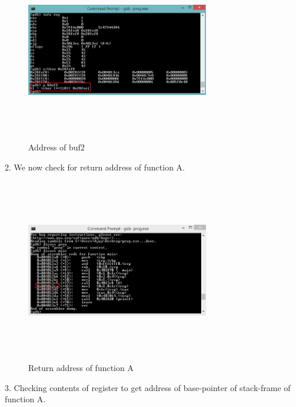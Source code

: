 \documentclass{article}
\begin{document}
      \begin{figure}[H]
	\begin{center}
	 

 \includegraphics[width=8cm,height=8cm]{buf2addr.JPG}
	\caption{Address of buf2}
		\end{center}
	\end{figure}
  2. We now check for return address of function A.
       
       
      \begin{figure}[H]
       \begin{center}
		\includegraphics[width=8cm,height=8cm]{disassMain.JPG}
	\caption{Return address of function A}
	\end{center}
	\end{figure}
  3. Checking contents of register to get address of base-pointer of stack-frame of function A.\\
   
\end{document}

